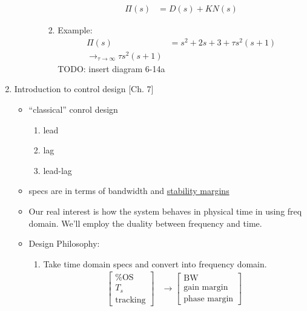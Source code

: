 \begin{enumerate}
\begin{enumerate}
\begin{enumerate}
\begin{enumerate}
                                \begin{align*}
                                    \Pi(s) &= D(s) + KN(s)
                                \end{align*}
                            \item Example:
                                \begin{align*}
                                    \Pi(s) &= s^2 + 2s + 3 + \tau s^2 (s + 1) \\
                                    \rightarrow_{\tau \to \infty} \tau s^2 (s + 1)
                                \end{align*}
                                TODO: insert diagram 6-14a
                        \end{enumerate}
                \end{enumerate}
        \end{enumerate}
    \item Introduction to control design [Ch. 7]
        \begin{itemize}
            \item ``classical'' conrol design
                \begin{enumerate}
                    \item lead
                    \item lag
                    \item lead-lag
                \end{enumerate}
            \item specs are in terms of bandwidth and \uline{stability margins}
            \item Our real interest is how the system behaves in physical time in using freq domain. We'll employ the duality between frequency and time.
            \item Design Philosophy:
                \begin{enumerate}
                    \item Take time domain specs and convert into frequency domain.
                        \begin{align*}
                            \begin{bmatrix}
                                \text{\% OS} \\
                                T_s \\
                                \text{tracking}
                            \end{bmatrix}
                            &\rightarrow
                            \begin{bmatrix}
                                \text{BW} \\
                                \text{gain margin} \\
                                \text{phase margin}
                            \end{bmatrix}
                        \end{align*}


\end{enumerate}
\end{itemize}
\end{enumerate}
